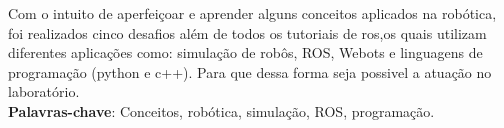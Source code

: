 \begin{thesisresumo}
Com o intuito de aperfeiçoar e aprender alguns conceitos aplicados na robótica, foi realizados cinco desafios além de todos os tutoriais
de ros,os quais utilizam diferentes aplicações como: simulação de robôs, ROS, Webots e linguagens de programação (python e c++). Para que
dessa forma seja possivel a atuação no laboratório.
\ \\



\textbf{Palavras-chave}: Conceitos, robótica, simulação, ROS, programação.

\end{thesisresumo}
